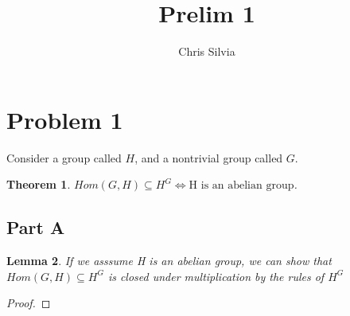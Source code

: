 \documentclass[14pt]{article}
\title{Prelim 1}
\author{Chris Silvia}
\newtheorem{thm}{Theorem}[section]
\newtheorem{lem}[thm]{Lemma}
\begin{document}
\maketitle

\section{Problem 1}

Consider a group called $H$, and a nontrivial group called $G$.
\begin{thm}
$Hom(G, H) \subseteq H^G \iff \text{H is an abelian group}$.
\end{thm}

\subsection{Part A}

\begin{lem}
If we asssume H is an abelian group, we can show that $Hom(G, H) \subseteq H^G$
is closed under multiplication by the rules of $H^G$
\end{lem}

\begin{proof}
\end{proof}
\end{document}
